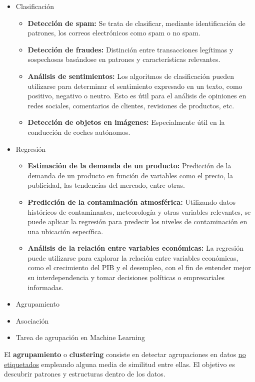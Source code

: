 \begin{itemize}[label=\color{lightblue}\textbullet]
	\item Clasificación
	\begin{itemize}[label=\color{lightblue}$\to$]
		\item \textbf{Detección de spam:} Se trata de clasificar, mediante identificación de patrones, los correos electrónicos como spam o no spam.
		\item \textbf{Detección de fraudes:} Distinción entre transacciones legítimas y sospechosas basándose en patrones y características relevantes.
		\item \textbf{Análisis de sentimientos:} Los algoritmos de clasificación pueden utilizarse para determinar el sentimiento expresado en un texto, como positivo, negativo o neutro. Esto es útil para el análisis de opiniones en redes sociales, comentarios de clientes, revisiones de productos, etc.
		\item \textbf{Detección de objetos en imágenes:} Especialmente útil en la conducción de coches autónomos.
	\end{itemize}
	\item Regresión
	\begin{itemize}[label=\color{lightblue}$\to$]
		\item \textbf{Estimación de la demanda de un producto:} Predicción de la demanda de un producto en función de variables como el precio, la publicidad, las tendencias del mercado, entre otras.
		\item \textbf{Predicción de la contaminación atmosférica:} Utilizando datos históricos de contaminantes, meteorología y otras variables relevantes, se puede aplicar la regresión para predecir los niveles de contaminación en una ubicación específica.
		\item \textbf{Análisis de la relación entre variables económicas:} La regresión puede utilizarse para explorar la relación entre variables económicas, como el crecimiento del PIB y el desempleo, con el fin de entender mejor su interdependencia y tomar decisiones políticas o empresariales informadas.
	\end{itemize}
	\item Agrupamiento
	\item Asociación
\end{itemize}
\begin{itemize}[label=\color{red}\textbullet, leftmargin=*]
	\item \color{lightblue}Tarea de agrupación en Machine Learning
\end{itemize}
El \textbf{agrupamiento} o \textbf{clustering} consiste en detectar agrupaciones en datos \underline{no etiquetados} empleando alguna media  de similitud entre ellas. El objetivo es descubrir patrones y estructuras dentro de los datos.

